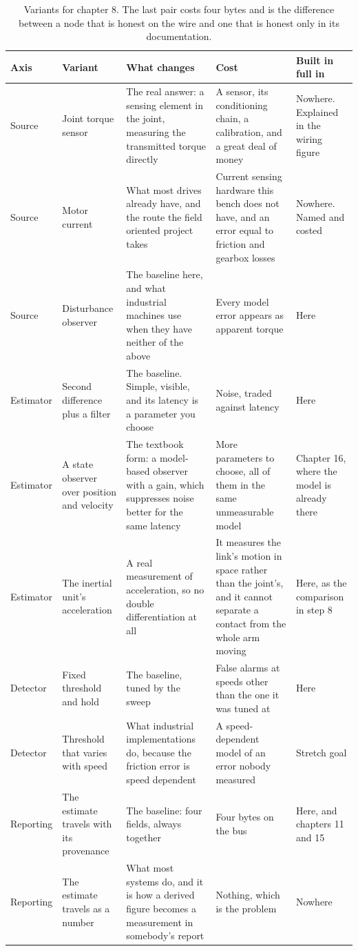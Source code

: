 \begin{table}[H]\centering\small
\begin{tabular}{p{24mm}p{26mm}p{44mm}p{22mm}p{20mm}}
\toprule
Axis & Variant & What changes & Cost & Built in full in \\
\midrule
Source & Joint torque sensor & The real answer: a sensing element in the joint, measuring the transmitted torque directly & A sensor, its conditioning chain, a calibration, and a great deal of money & Nowhere. Explained in the wiring figure \\
Source & Motor current & What most drives already have, and the route the field oriented project takes & Current sensing hardware this bench does not have, and an error equal to friction and gearbox losses & Nowhere. Named and costed \\
Source & Disturbance observer & The baseline here, and what industrial machines use when they have neither of the above & Every model error appears as apparent torque & Here \\
Estimator & Second difference plus a filter & The baseline. Simple, visible, and its latency is a parameter you choose & Noise, traded against latency & Here \\
Estimator & A state observer over position and velocity & The textbook form: a model-based observer with a gain, which suppresses noise better for the same latency & More parameters to choose, all of them in the same unmeasurable model & Chapter 16, where the model is already there \\
Estimator & The inertial unit's acceleration & A real measurement of acceleration, so no double differentiation at all & It measures the link's motion in space rather than the joint's, and it cannot separate a contact from the whole arm moving & Here, as the comparison in step 8 \\
Detector & Fixed threshold and hold & The baseline, tuned by the sweep & False alarms at speeds other than the one it was tuned at & Here \\
Detector & Threshold that varies with speed & What industrial implementations do, because the friction error is speed dependent & A speed-dependent model of an error nobody measured & Stretch goal \\
Reporting & The estimate travels with its provenance & The baseline: four fields, always together & Four bytes on the bus & Here, and chapters 11 and 15 \\
Reporting & The estimate travels as a number & What most systems do, and it is how a derived figure becomes a measurement in somebody's report & Nothing, which is the problem & Nowhere \\
\bottomrule
\end{tabular}
\caption{Variants for chapter 8. The last pair costs four bytes and is the difference between a node that is honest on the wire and one that is honest only in its documentation.}
\end{table}

